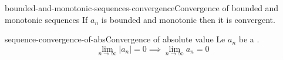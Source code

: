 \documentclass[preview]{standalone}
\begin{document}
\begin{snippettheorem}{bounded-and-monotonic-sequences-convergence}{Convergence of bounded and monotonic sequences}
    If \(a_n\) is bounded and monotonic then it is convergent.
\end{snippettheorem}

\begin{snippettheorem}{sequence-convergence-of-abs}{Convergence of absolute value}
    Le \(a_n\) be a \sequence.
    \[ \lim_{n\to\infty} |a_n| = 0 \implies \lim_{n\to\infty} a_n = 0 \]
\end{snippettheorem}

\end{document}
